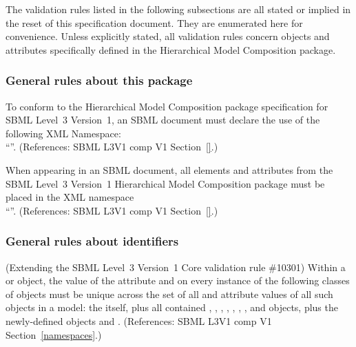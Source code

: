 The validation rules listed in the following subsections are all stated
or implied in the reset of this specification document.  They are
enumerated here for convenience.  Unless explicitly stated, all
validation rules concern objects and attributes specifically defined in
the Hierarchical Model Composition package.


\subsubsection*{General rules about this package} \begin{sbmlenum}

 {To conform to the  Hierarchical Model Composition
  package specification for SBML Level~3 Version~1, an SBML document must
  declare the use of the following XML Namespace:\\
  ``''.
  (References: SBML L3V1 comp V1 Section~\ref{}.)}
  

 {  When appearing in an SBML document, all elements
  and attributes from the SBML Level~3 Version~1 Hierarchical Model
  Composition package must be placed in the XML namespace\\
  ``''.
  (References: SBML L3V1 comp V1 Section~\ref{}.) }


\end{sbmlenum} \subsubsection*{General rules about identifiers} \begin{sbmlenum}

 {  (Extending the SBML Level~3 Version~1 Core
  validation rule \#10301) Within a \Model or \ExternalModelDefinition
  object, the value of the attribute  and  on
  every instance of the following classes of objects must be unique
  across the set of all  and  attribute values
  of all such objects in a model: the \Model itself, plus all contained
  \FunctionDefinition, \Compartment, \Species, \Reaction,
  \SpeciesReference, \ModifierSpeciesReference, \Event, and \Parameter
  objects, plus the newly-defined objects \Submodel and \Deletion.
  (References: SBML L3V1 comp V1 Section~\ref{namespaces}.) }



\end{sbmlenum}
